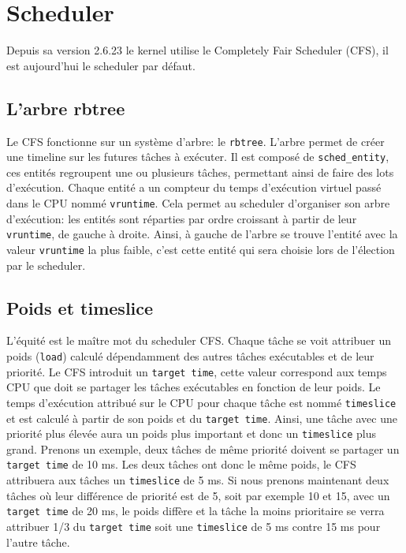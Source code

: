 \section{Scheduler}

Depuis sa version 2.6.23 le kernel utilise le Completely Fair Scheduler (CFS),
il est aujourd'hui le scheduler par défaut.

\subsection{L'arbre rbtree}
Le CFS fonctionne sur un système d'arbre: le \verb|rbtree|. L'arbre permet de
créer une timeline sur les futures tâches à exécuter.
Il est composé de \verb|sched_entity|, ces entités regroupent une ou plusieurs
tâches, permettant ainsi de faire des lots d'exécution. Chaque entité a un compteur
du temps d'exécution virtuel passé dans le
CPU nommé \verb|vruntime|. Cela permet au scheduler d'organiser son
arbre d'exécution: les entités sont réparties par ordre croissant à partir de
leur \verb|vruntime|, de gauche à droite. Ainsi, à gauche de l'arbre se trouve
l'entité avec la valeur \verb|vruntime| la plus faible, c'est cette entité qui
sera choisie lors de l'élection par le scheduler.

\subsection{Poids et timeslice}
L'équité est le maître mot du scheduler CFS. Chaque tâche se voit attribuer un poids
(\verb|load|) calculé dépendamment des autres tâches exécutables et de leur priorité.
Le CFS introduit un \verb|target time|, cette valeur correspond aux temps CPU que doit se partager
les tâches exécutables en fonction de leur poids. Le temps d'exécution attribué sur le CPU pour 
chaque tâche est nommé \verb|timeslice| et est calculé à partir de son poids et 
du \verb|target time|. Ainsi, une tâche avec une priorité plus élevée aura un poids 
plus important et donc un \verb|timeslice| plus grand.
Prenons un exemple, deux tâches de  même priorité doivent se partager un 
\verb|target time| de 10 ms. Les deux tâches ont donc le même poids, le CFS attribuera 
aux tâches un \verb|timeslice| de 5 ms. Si nous prenons 
maintenant deux tâches où leur différence de priorité est de 5, soit par 
exemple 10 et 15, avec un \verb|target time| de 20 ms, le poids diffère et la 
tâche la moins prioritaire se verra attribuer 1/3 du \verb|target time| soit 
une \verb|timeslice| de 5 ms contre 15 ms pour l'autre tâche.

